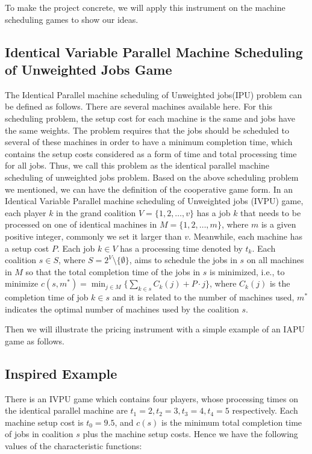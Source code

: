 To make the project concrete, we will apply this instrument on the machine scheduling games to show our ideas.


\subsection{Identical Variable Parallel Machine Scheduling of Unweighted Jobs Game}

The Identical Parallel machine scheduling of Unweighted jobs(IPU) problem can be defined as follows. There are several machines available here. For this scheduling problem, the setup cost for each machine is the same and jobs have the same weights. The problem requires that the jobs should be scheduled to several of these machines in order to have a minimum completion time, which contains the setup costs considered as a form of time and total processing time for all jobs. Thus, we call this problem as the
identical parallel machine scheduling of unweighted jobs problem.
Based on the above scheduling problem we mentioned, we can have the definition of the cooperative game form.
In an Identical Variable Parallel machine scheduling of Unweighted jobs (IVPU) game, each player $k$ in the grand coalition $V=\{1,2,\ldots,v\}$ has a job $k$ that needs to be processed on one of identical machines in $M=\{1,2,\ldots,m\}$, where $m$ is a given positive integer, commonly we set it larger than $v$. Meanwhile, each machine has a setup cost $P$. Each job $k\in V$ has a processing time denoted by $t_k$. Each coalition $s \in S$, where $S=2^V\setminus\{\emptyset\}$, aims to schedule the jobs in $s$ on all machines in $M$ so that the total completion time of the jobs in $s$ is minimized, i.e., to minimize
$c(s,m^*) = \min_{j \in M} \{\sum_{k\in s}{C_k(j)}+ P\cdot j\}$, where $C_k(j)$ is the completion time of job $k\in s$ and it is related to the number of machines used, $m^*$ indicates the optimal number of machines used by the coalition $s$.

Then we will illustrate the pricing instrument with a simple example of an IAPU game as follows.


\subsection{Inspired Example}
There is an IVPU game which contains four players, whose processing times on the identical parallel machine are $t_1=2, t_2=3, t_3=4, t_4=5$ respectively. Each machine setup cost is $t_0=9.5$, and $c(s)$ is the minimum total completion time of jobs in coalition $s$ plus the machine setup costs.
Hence we have the following values of the characteristic functions:

